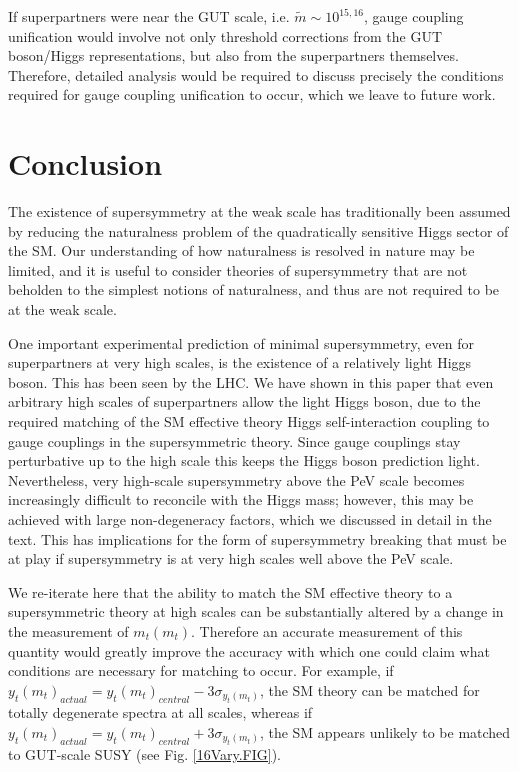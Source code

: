 \documentclass[12pt]{article}
\newcommand{\mS}{\tilde{m}}
\begin{document}
If superpartners were near the GUT scale, i.e. $\mS \sim 10^{15,16}$, gauge coupling unification would involve not only threshold corrections from the GUT boson/Higgs representations, but also from the superpartners themselves. Therefore, detailed analysis would be required to discuss precisely the conditions required for gauge coupling unification to occur, which we leave to future work.



\section{Conclusion}
\label{Conclusion.SEC}

The existence of supersymmetry at the weak scale has traditionally been assumed by reducing the naturalness problem of the quadratically sensitive Higgs sector of the SM. Our understanding of how naturalness is resolved in nature may be limited, and it is useful to consider theories of supersymmetry that are not beholden to the simplest notions of naturalness, and thus are not required to be at the weak scale. 

One important experimental prediction of minimal supersymmetry, even for superpartners at very high scales, is the existence of a relatively light Higgs boson. This has been seen by the LHC. We have shown in this paper that even arbitrary high scales of superpartners allow the light Higgs boson, due to the required matching of the SM effective theory Higgs self-interaction coupling to gauge couplings in the supersymmetric theory. Since gauge couplings stay perturbative up to the high scale this keeps the Higgs boson prediction light. Nevertheless, very high-scale supersymmetry above the PeV scale becomes increasingly difficult to reconcile with the Higgs mass; however, this may be achieved with large non-degeneracy factors, which we discussed in detail in the text. This has implications for the form of supersymmetry breaking that must be at play if supersymmetry is at very high scales well above the PeV scale. 

We re-iterate here that the ability to match the SM effective theory to a supersymmetric theory at high scales can be substantially altered by a change in the measurement of $m_t(m_t)$. Therefore an accurate measurement of this quantity would greatly improve the accuracy with which one could claim what conditions are necessary for matching to occur. For example, if $y_t(m_t)_{actual}=y_t(m_t)_{central}-3\sigma_{y_t(m_t)}$, the SM theory can be matched for totally degenerate spectra at all scales, whereas if $y_t(m_t)_{actual}=y_t(m_t)_{central}+3\sigma_{y_t(m_t)}$, the SM appears unlikely to be matched to GUT-scale SUSY (see Fig. \ref{16Vary.FIG}).
\end{document}
